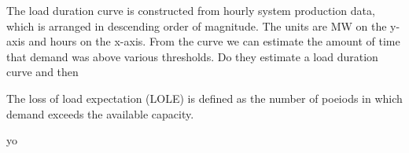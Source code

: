 \documentclass[10pt]{amsart}
\begin{document}
The load duration curve is constructed from hourly system production data, which is arranged in descending order of magnitude. 
The units are MW on the y-axis and hours on the x-axis. 
From the curve we can estimate the amount of time that demand was above various thresholds. 
Do they estimate a load duration curve and then 

The loss of load expectation (LOLE) is defined as the number of poeiods in which demand exceeds the available capacity.

yo
\end{document}
